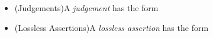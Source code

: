 \begin{itemize}
\item (\prhl Judgements)\quad A \prhl \emph{judgement} has the form
  \begin{center}
  \end{center}

\item (Lossless Assertions)\quad A \emph{lossless assertion} has the form
  \begin{center}
  \end{center}

\end{itemize}